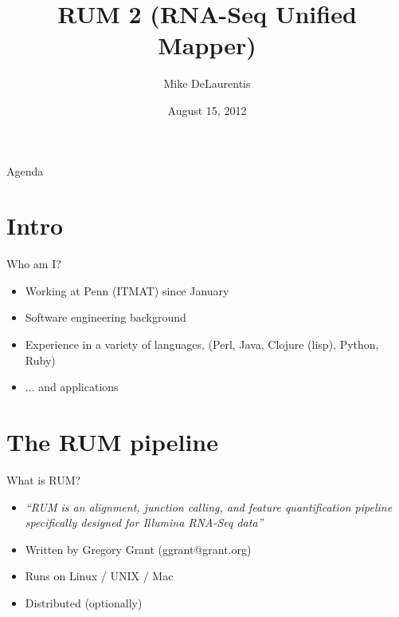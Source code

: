 \documentclass{beamer}
\title[RUM 2]{RUM 2 (RNA-Seq Unified Mapper)}
\author{Mike DeLaurentis}
\institute{University of Pennsylvania}
\date{August 15, 2012}
\begin{document}
\begin{frame}
\titlepage
\end{frame}

\begin{frame}{Agenda}
  \tableofcontents
\end{frame}

\section{Intro}

\begin{frame}{Who am I?}
  \begin{itemize}
  \item Working at Penn (ITMAT) since January
  \item Software engineering background
  \item Experience in a variety of languages, (Perl, Java, Clojure (lisp), Python, Ruby)
  \item ... and applications
  \end{itemize}
\end{frame}

\section{The RUM pipeline}

\begin{frame}{What is RUM?}
  \begin{itemize}
  \item \textit{``RUM is an alignment, junction calling, and feature quantification pipeline specifically designed for Illumina RNA-Seq data''}
  \item Written by Gregory Grant (ggrant@grant.org)
  \item Runs on Linux / UNIX / Mac
  \item Distributed (optionally)
  \end{itemize}
\end{frame}
\end{document}
